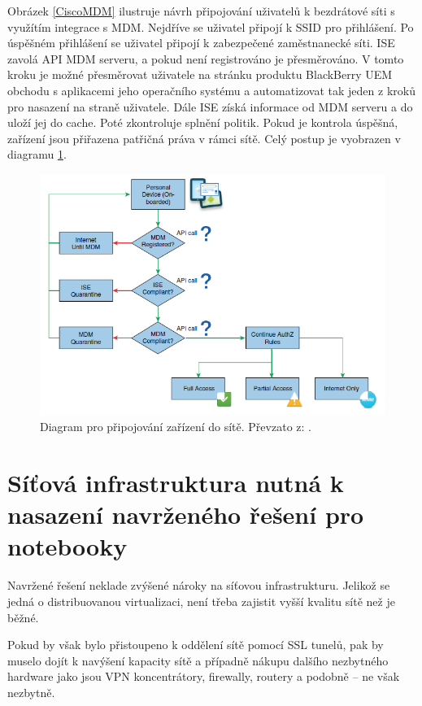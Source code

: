 Obrázek \ref{CiscoMDM} ilustruje návrh připojování uživatelů k bezdrátové síti s využítím integrace s MDM. Nejdříve se uživatel připojí k SSID pro přihlášení. Po úspěšném přihlášení se uživatel připojí k zabezpečené zaměstnanecké síti. ISE zavolá API MDM serveru, a pokud není registrováno je přesměrováno. V tomto kroku je možné přesměrovat uživatele na stránku produktu BlackBerry UEM obchodu s aplikacemi jeho operačního systému a automatizovat tak jeden z kroků pro nasazení na straně uživatele. Dále ISE získá informace od MDM serveru a do uloží jej do cache. Poté zkontroluje splnění politik. Pokud je kontrola úspěšná, zařízení jsou přiřazena patřičná práva v rámci sítě. Celý postup je vyobrazen v diagramu \ref{CiscoFlow}.


\begin{figure}[h!]
\centering
\includegraphics[width=13cm]{img/CiscoFlow}
\caption{Diagram pro připojování zařízení do sítě. Převzato z: \cite{CiscoDesign}.\label{CiscoFlow}}
\end{figure}%


\section{Síťová infrastruktura nutná k nasazení navrženého řešení pro notebooky}
Navržené řešení neklade zvýšené nároky na síťovou infrastrukturu. Jelikož se jedná o distribuovanou virtualizaci, není třeba zajistit vyšší kvalitu sítě než je běžné.

Pokud by však bylo přistoupeno k oddělení sítě pomocí SSL tunelů, pak by muselo dojít k navýšení kapacity sítě a případně nákupu dalšího nezbytného hardware jako jsou VPN koncentrátory, firewally, routery a podobně -- ne však nezbytně.

